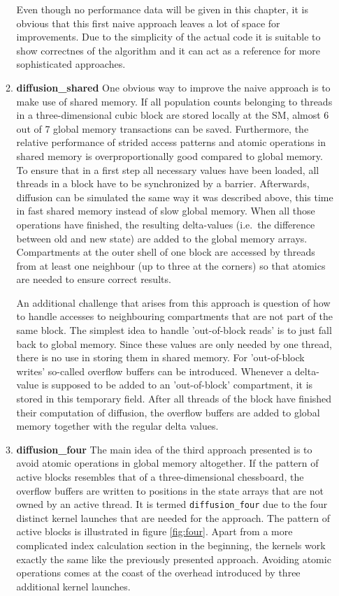 \begin{enumerate}
\begin{enumerate}
Even though no performance data will be given in this chapter, it is obvious that this first naive approach leaves a lot of space for improvements. Due to the simplicity of the actual code it is suitable to show correctnes of the algorithm and it can act as a reference for more sophisticated approaches. 
\item \textbf{diffusion\_shared} One obvious way to improve the naive approach is to make use of shared memory. If all population counts belonging to threads in a three-dimensional cubic block are stored locally at the SM, almost 6 out of 7 global memory transactions can be saved. Furthermore, the relative performance of strided access patterns and atomic operations in shared memory is overproportionally good compared to global memory. To ensure that in a first step all necessary values have been loaded, all threads in a block have to be synchronized by a barrier. Afterwards, diffusion can be simulated the same way it was described above, this time in fast shared memory instead of slow global memory. When all those operations have finished, the resulting delta-values (i.e.\ the difference between old and new state) are added to the global memory arrays. Compartments at the outer shell of one block are accessed by threads from at least one neighbour (up to three at the corners) so that atomics are needed to ensure correct results. 

An additional challenge that arises from this approach is question of how to handle accesses to neighbouring compartments that are not part of the same block. The simplest idea to handle 'out-of-block reads' is to just fall back to global memory. Since these values are only needed by one thread, there is no use in storing them in shared memory. For 'out-of-block writes' so-called overflow buffers can be introduced. Whenever a delta-value is supposed to be added to an 'out-of-block' compartment, it is stored in this temporary field. After all threads of the block have finished their computation of diffusion, the overflow buffers are added to global memory together with the regular delta values. 
\item \textbf{diffusion\_four}
The main idea of the third approach presented is to avoid atomic operations in global memory altogether. If the pattern of active blocks resembles that of a three-dimensional chessboard, the overflow buffers are written to positions in the state arrays that are not owned by an active thread. It is termed \texttt{diffusion\_four} due to the four distinct kernel launches that are needed for the approach. The pattern of active blocks is illustrated in figure \ref{fig:four}. Apart from a more complicated index calculation section in the beginning, the kernels work exactly the same like the previously presented approach. Avoiding atomic operations comes at the coast of the overhead introduced by three additional kernel launches. 
\end{enumerate}


\end{enumerate}
